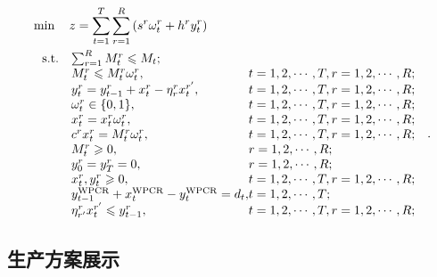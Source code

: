 \begin{equation}\label{二模型}
	\begin{aligned}
&\min \quad z  = \sum_{t  = 1}^{T} \sum_{r = 1}^{R}\left(s^{r} \omega_{t}^{r}+h^{r} y_{t}^{r}\right)\\
& \ \begin{array}{r@{\quad}l@{}l@{\quad}l}
\mathrm{s.t. } 	&\sum_{r=1}^{R} M_{t}^{r} \leqslant M_{t}; &\\
&M_{t}^{r} \leqslant M_{t}^{r} \omega_{t}^{r}, &t=1,2, \cdots, T, r=1,2, \cdots, R;\\
& y_{t}^{r}=y_{t-1}^{r}+x_{t}^{r}-\eta_{r}^{r} x_{t}^{r^{\prime}}, &t=1,2, \cdots, T,  r=1,2, \cdots, R; \\
&\omega_{t}^{r} \in\{0,1\}, &t=1,2, \cdots, T, r=1,2, \cdots, R; \\
&x_{t}^{r}=x_{t}^{r} \omega_{t}^{r},&t=1,2, \cdots, T, r=1,2, \cdots, R;\\
&c^{r} x_{t}^{r}=M_{t}^{r} \omega_{t}^{r}, &t=1,2, \cdots, T, r=1,2, \cdots, R; \\
&M_{t}^{r} \geqslant 0,& r=1,2, \cdots, R ;\\
&y_{0}^{r}=y_{T}^{r}=0,& r=1,2, \cdots, R ;\\
&x_{t}^{r}, y_{t}^{r} \geqslant 0, &t=1,2, \cdots, T, r=1,2, \cdots, R;\\
&y_{t-1}^{\mathrm{WPCR}}+x_{t}^{\mathrm{WPCR}}-y_{t}^{\mathrm{WPCR}}=d_{t}, & t=1,2, \cdots, T; \\
&\eta_{r^{\prime}}^{r} x_{t}^{r^{\prime}} \leqslant y_{t-1}^{r}, &t=1,2, \cdots, T, r=1,2, \cdots, R;
\end{array}.
\end{aligned}
\end{equation}

\subsection{生产方案展示} %
\label{sub:生产方案展示}

